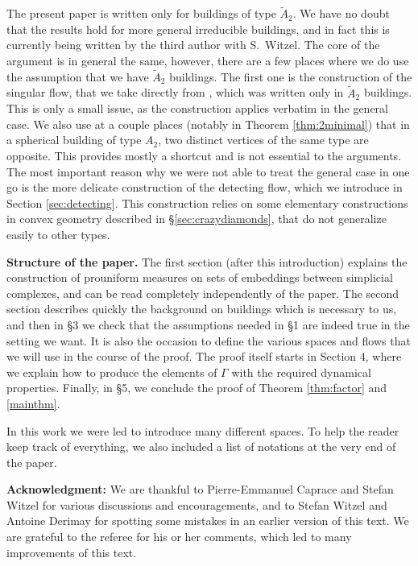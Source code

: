 \documentclass[a4paper, 11pt]{article}
\theoremstyle{plain}
\theoremstyle{definition}
\theoremstyle{remark}
\begin{document}

The present paper is written only for buildings of type $\tilde A_2$. We have no doubt that the results hold for more general irreducible buildings, and in fact this is currently being written by the third author with S.~Witzel. The core of the argument is in general the same, however, there are a few places where we do use the assumption that we have $\tilde A_2$ buildings. The first one is the construction of the singular flow, that we take directly from \cite{BCL}, which was written only in $\tilde A_2$ buildings. This is only a small issue, as the construction applies verbatim in the general case. We also use at a couple places (notably in Theorem \ref{thm:2minimal}) that in a spherical building of type $A_2$, two distinct vertices of the same type are opposite.  This provides mostly a shortcut and is not essential to the arguments. The most important reason why we were not able to treat the general case in one go is the more delicate construction of the detecting flow, which we introduce in Section \ref{sec:detecting}. This construction relies on some elementary constructions in convex geometry described in \S \ref{sec:crazydiamonds}, that do not generalize easily to other types.

\medskip
\textbf{Structure of the paper.} The first section (after this introduction) explains the construction of prouniform measures on sets of embeddings between simplicial complexes, and can be read completely independently of the paper. The second section describes quickly the background on buildings which is necessary to us, and then in \S 3 we check that the assumptions needed in \S1 are indeed true in the setting we want. It is also the occasion to define the various spaces and flows that we will use in the course of the proof. The proof itself starts in Section 4, where we explain how to produce the elements of $\Gamma$ with the required dynamical properties. Finally, in \S5, we conclude the proof of Theorem \ref{thm:factor} and \ref{mainthm}.

In this work we were led to introduce many different spaces. To help the reader keep track of everything, we also included a list of notations at the very end of the paper.

\medskip
\textbf{Acknowledgment:} We are thankful to Pierre-Emmanuel Caprace and Stefan Witzel for various discussions and encouragements, and to Stefan Witzel and Antoine Derimay for spotting some mistakes in an earlier version of this text. We are grateful to the referee for his or her comments, which led to many improvements of this text.
\end{document}
